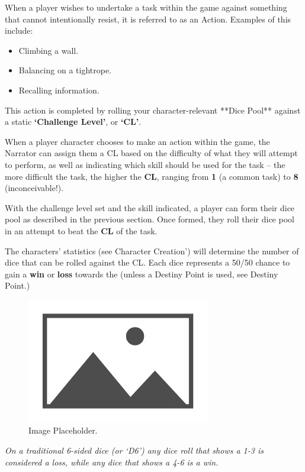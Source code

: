 When a player wishes to undertake a task within the game against something that cannot intentionally resist, it is referred to as an Action. Examples of this include:

\begin{itemize}
    \item Climbing a wall.
    \item Balancing on a tightrope.
    \item Recalling information.
\end{itemize}

This action is completed by rolling your character-relevant **Dice Pool** against a static \textbf{‘Challenge Level’}, or \textbf{‘CL’}.

When a player character chooses to make an action within the game, the Narrator can assign them a CL based on the difficulty of what they will attempt to perform, as well as indicating which skill should be used for the task – the more difficult the task, the higher the \textbf{CL}, ranging from \textbf{1} (a common task) to \textbf{8} (inconceivable!).

With the challenge level set and the skill indicated, a player can form their dice pool as described in the previous section. Once formed, they roll their dice pool in an attempt to beat the \textbf{CL} of the task.

The characters’ statistics (see Character Creation’) will determine the number of dice that can be rolled against the CL. Each dice represents a 50/50 chance to gain a \textbf{win} or \textbf{loss} towards the  (unless a Destiny Point is used, see Destiny Point.)

\begin{figure}[H]
    \includegraphics[width=8cm]{images/placeholder}
    \centering
    \caption{Image Placeholder.}
\end{figure}

\textit{On a traditional 6-sided dice (or ‘D6’) any dice roll that shows a 1-3 is considered a loss, while any dice that shows a 4-6 is a win.}

